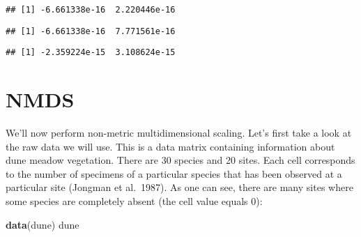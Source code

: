 \documentclass[
]{book}
\newenvironment{Shaded}{\begin{snugshade}}{\end{snugshade}}
\newcommand{\KeywordTok}[1]{\textcolor[rgb]{0.13,0.29,0.53}{\textbf{#1}}}
\newcommand{\NormalTok}[1]{#1}
\newcommand{\OperatorTok}[1]{\textcolor[rgb]{0.81,0.36,0.00}{\textbf{#1}}}
\newcommand{\StringTok}[1]{\textcolor[rgb]{0.31,0.60,0.02}{#1}}
\begin{document}
\begin{Shaded}
\end{Shaded}

\begin{verbatim}
## [1] -6.661338e-16  2.220446e-16
\end{verbatim}

\begin{Shaded}
\end{Shaded}

\begin{verbatim}
## [1] -6.661338e-16  7.771561e-16
\end{verbatim}

\begin{Shaded}
\end{Shaded}

\begin{verbatim}
## [1] -2.359224e-15  3.108624e-15
\end{verbatim}

\hypertarget{nmds}{%
\section{NMDS}\label{nmds}}

We'll now perform non-metric multidimensional scaling. Let's first take a look at the raw data we will use. This is a data matrix containing information about dune meadow vegetation. There are 30 species and 20 sites. Each cell corresponds to the number of specimens of a particular species that has been observed at a particular site (Jongman et al.~1987). As one can see, there are many sites where some species are completely absent (the cell value equals 0):

\begin{Shaded}
\begin{Highlighting}[]
\KeywordTok{data}\NormalTok{(dune)}
\NormalTok{dune}
\end{Highlighting}
\end{Shaded}
\end{document}
